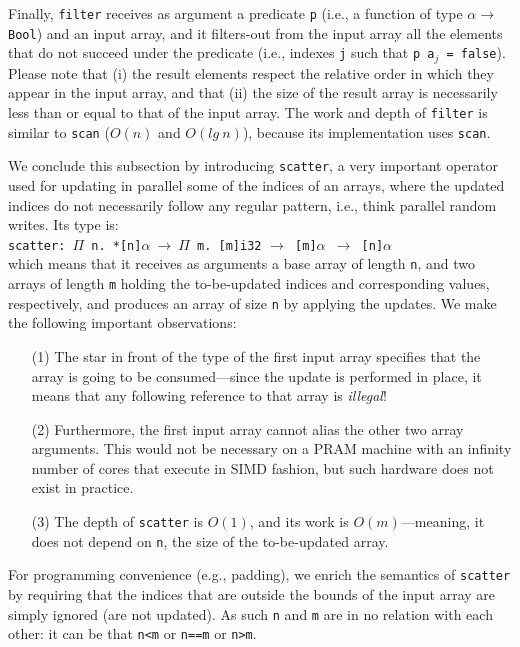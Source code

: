\documentclass[acmsmall,review]{acmart}\settopmatter{printfolios=true,printccs=false,printacmref=false}
\begin{document}
Finally, \lstinline{filter} receives as argument a predicate {\tt p} 
(i.e., a function of type $\alpha\to${\tt{}Bool}) and an input array,
and it filters-out from the input array all the elements that do not
succeed under the predicate (i.e., indexes {\tt j} such that 
{\tt p a$_j$ = }\lstinline{false}). Please note that (i) the result
elements respect the relative order in which they appear in the input
array, and that (ii) the size of the result array is necessarily 
less than or equal to that of the input array. The work and depth
of \lstinline{filter} is similar to \lstinline{scan} 
($O(n)$ and $O(lg~n)$), because its implementation uses \lstinline{scan}. 

We conclude this subsection by introducing \lstinline{scatter},
a very important operator used for updating in parallel some of 
the indices of an arrays, where the updated indices do not necessarily
follow any regular pattern, i.e., think parallel random writes.
Its type is:\\
\lstinline{scatter}{\tt : $\Pi$ n. *[n]$\alpha~\to~\Pi$ m. [m]}\lstinline{i32}
{\tt$\to$ [m]$\alpha$ $\to$ [n]$\alpha$}\\
which means that it receives as arguments a base array of length {\tt n},
and two arrays of length {\tt m} holding the to-be-updated
indices and corresponding values, respectively, and produces an array
of size {\tt n} by applying the updates. We make the following
important observations:
\begin{itemize}
    \item[(1)] The star {\tt *} in front of the type of the first input 
        array specifies that the array is going to be consumed---since
        the update is performed in place, it means that any following 
        reference to that array is \emph{illegal}! 
    \item[(2)] Furthermore, the first input array cannot alias the other two 
        array arguments. This would not be necessary on a PRAM machine
        with an infinity number of cores that execute in SIMD fashion,
        but such hardware does not exist in practice.
    \item[(3)] The depth of \lstinline{scatter} is $O(1)$, and its work is 
        $O(m)$---meaning, it does not depend on {\tt n}, the size of 
        the to-be-updated array.
\end{itemize}
For programming convenience (e.g., padding), we enrich the semantics
of \lstinline{scatter} by requiring that the indices that are 
outside the bounds of the input array are simply ignored (are not
updated). As such {\tt n} and {\tt m} are in no relation with
each other: it can be that {\tt n<m} or {\tt n==m} or {\tt n>m}. 
\end{document}
